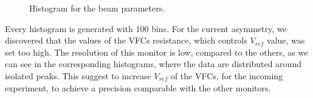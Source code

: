 \begin{figure}[!hbtp]
\caption{Histogram for the beam parameters.}
\label{fig:BeamParameters}
\end{figure}

Every histogram is generated with $100$ bins. For the current asymmetry, we discovered that the values of the VFCs resistance, which controls $V_{ref}$ value, was set too high. The resolution of this monitor is low, compared to the others, as we can see in the corresponding histograms, where the data are distributed around isolated peaks. This suggest to increase $V_{ref}$ of the VFCs, for the incoming experiment, to achieve a precision comparable with the other monitors.

